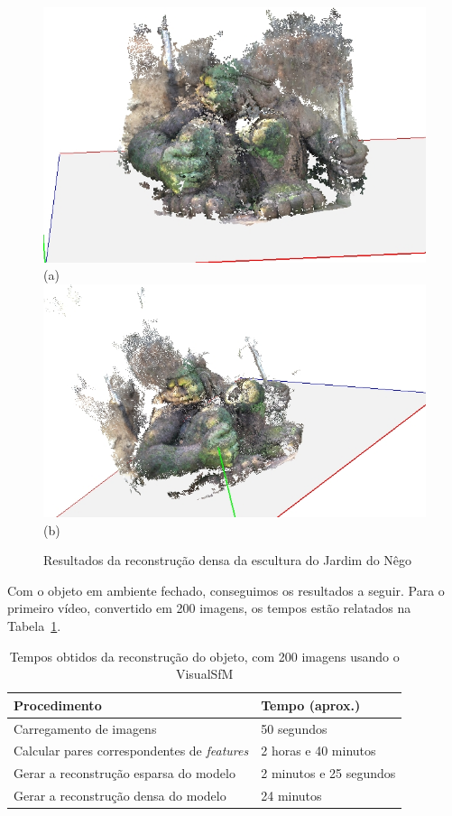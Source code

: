 \begin{figure}[!h]
	\centering
	\caption{Resultados da reconstrução densa da escultura do Jardim do Nêgo}
	\includegraphics[width=0.40\linewidth]{figs/guerreirovisualsfmdmr.jpg}(a)
	\includegraphics[width=0.50\linewidth]{figs/guerreirovisualsfmdmr2.jpg}(b)
		\label{fig:reconstrucaoDensaIndioVisualSFM}
\end{figure}



Com o objeto em ambiente fechado, conseguimos os resultados a seguir. 
Para o primeiro vídeo, convertido em 200 imagens, os tempos estão relatados na
Tabela~\ref{tab:temposSfM}.

\newpage

\begin{table}[!h]
\caption{Tempos obtidos da reconstrução do objeto, com 200 imagens usando o VisualSfM}
\label{tab:temposSfM}
\begin{tabular}{|l|p{4.7cm}|}
\hline
Procedimento & Tempo (aprox.) \\ \hline
Carregamento de imagens & 50 segundos \\ \hline
Calcular pares correspondentes de \emph{features} & 2 horas e 40 minutos \\ \hline
Gerar a reconstrução esparsa do modelo & 2 minutos e 25 segundos \\ \hline
Gerar a reconstrução densa do modelo & 24 minutos \\ \hline
\end{tabular}
\end{table}

